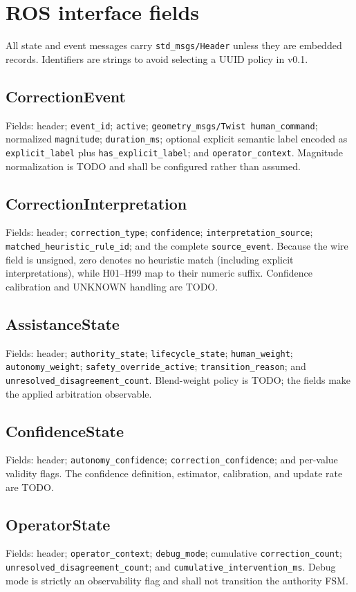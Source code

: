 \documentclass[11pt]{article}
\begin{document}
\section{ROS interface fields}
All state and event messages carry \texttt{std\_msgs/Header} unless they are
embedded records. Identifiers are strings to avoid selecting a UUID policy in
v0.1.

\subsection{CorrectionEvent}
Fields: header; \texttt{event\_id}; \texttt{active};
\texttt{geometry\_msgs/Twist human\_command}; normalized
\texttt{magnitude}; \texttt{duration\_ms}; optional explicit semantic label
encoded as \texttt{explicit\_label} plus \texttt{has\_explicit\_label}; and
\texttt{operator\_context}. Magnitude normalization is TODO and shall be
configured rather than assumed.

\subsection{CorrectionInterpretation}
Fields: header; \texttt{correction\_type}; \texttt{confidence};
\texttt{interpretation\_source}; \texttt{matched\_heuristic\_rule\_id}; and
the complete \texttt{source\_event}. Because the wire field is unsigned,
zero denotes no heuristic match (including explicit interpretations), while
H01--H99 map to their numeric suffix. Confidence calibration and UNKNOWN
handling are TODO.

\subsection{AssistanceState}
Fields: header; \texttt{authority\_state}; \texttt{lifecycle\_state};
\texttt{human\_weight}; \texttt{autonomy\_weight};
\texttt{safety\_override\_active}; \texttt{transition\_reason}; and
\texttt{unresolved\_disagreement\_count}. Blend-weight policy is TODO; the
fields make the applied arbitration observable.

\subsection{ConfidenceState}
Fields: header; \texttt{autonomy\_confidence};
\texttt{correction\_confidence}; and per-value validity flags. The confidence
definition, estimator, calibration, and update rate are TODO.

\subsection{OperatorState}
Fields: header; \texttt{operator\_context}; \texttt{debug\_mode}; cumulative
\texttt{correction\_count}; \texttt{unresolved\_disagreement\_count}; and
\texttt{cumulative\_intervention\_ms}. Debug mode is strictly an observability
flag and shall not transition the authority FSM.
\end{document}
